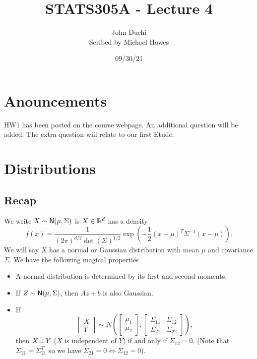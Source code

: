 




\title{STATS305A - Lecture 4}
\author{John Duchi\\ Scribed by Michael Howes}
\date{09/30/21}

\pagestyle{fancy}
\fancyhf{}


\maketitle
\tableofcontents

\section{Anouncements}
HW1 has been posted on the course webpage. An additional question will be added. The extra question will relate to our first Etude.

\section{Distributions}
\subsection{Recap}
We write $X\sim {\mathsf{N}}(\mu,\Sigma)$ is $X \in {\mathbb R}^d$ has a density
\[f(x) = \frac{1}{(2\pi)^{d/2}\det(\Sigma)^{1/2}}\exp\left(-\frac{1}{2}(x-\mu)^T\Sigma^{-1}(x-\mu)\right). \]
We will say $X$ has a normal or Gaussian distribution with mean $\mu$ and covariance $\Sigma$. We have the following magical properties

\begin{itemize}
    \item A normal distribution is determined by its first and second moments.
    \item If $Z \sim {\mathsf{N}}(\mu, \Sigma)$, then $Az+b$ is also Gaussian.
    \item If 
    \[\begin{bmatrix}
        X\\Y
    \end{bmatrix}\sim N\left(\begin{bmatrix}
        \mu_1\\ \mu_2
    \end{bmatrix}, \begin{bmatrix}
        \Sigma_{11}&\Sigma_{12}\\
        \Sigma_{21}&\Sigma_{22}
    \end{bmatrix}\right), \]
    then $X {\perp\!\!\!\perp} Y$ ($X$ is independent of $Y$) if and only if $\Sigma_{12}=0$. (Note that $\Sigma_{21}=\Sigma_{21}^T$ so we have $\Sigma_{21}=0 \iff \Sigma_{12}=0$).
\end{itemize}

